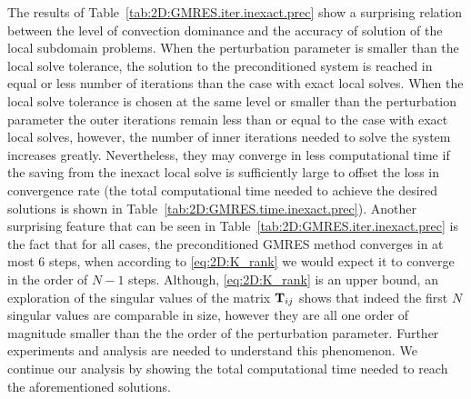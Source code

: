 The results of Table~\ref{tab:2D:GMRES.iter.inexact.prec} show a surprising relation between the level of convection dominance and the accuracy of solution of the local subdomain problems. When the perturbation parameter is smaller than the local solve tolerance, the solution to the preconditioned system is reached in equal or less number of iterations than the case with exact local solves. When the local solve tolerance is chosen at the same level or smaller than the perturbation parameter the outer iterations remain less than or equal to the case with exact local solves, however, the number of inner iterations needed to solve the system increases greatly. Nevertheless, they may converge in less computational time if the saving from the inexact local solve is sufficiently large to offset the loss in convergence rate (the total computational time needed to achieve the desired solutions is shown in Table~\ref{tab:2D:GMRES.time.inexact.prec}). Another surprising feature that can be seen in Table~\ref{tab:2D:GMRES.iter.inexact.prec} is the fact that for all cases, the preconditioned GMRES method converges in at most 6 steps, when according to \eqref{eq:2D:K_rank} we would expect it to converge in the order of $N-1$ steps. Although, \eqref{eq:2D:K_rank} is an upper bound, an exploration of the singular values of the matrix $\mathbf{T}_{ij}$ shows that indeed the first $N$ singular values are comparable in size, however they are all one order of magnitude smaller than the the order of the perturbation parameter. Further experiments and analysis are needed to understand this phenomenon. We continue our analysis by showing the total computational time needed to reach the aforementioned solutions.

